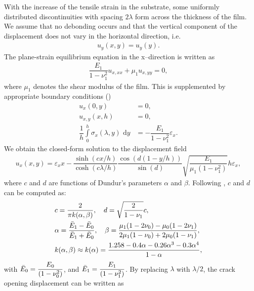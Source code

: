 



With the increase of the tensile strain in the substrate, some uniformly distributed discontinuities with spacing $2\lambda$ form across the thickness of the film. We assume that no debonding occurs and that the vertical component of the displacement does not vary in the horizontal direction, i.e.
\begin{align}
  u_y(x,y) = u_y(y) .
\end{align}
The plane-strain equilibrium equation in the x--direction is written as
\begin{align}
  \dfrac{E_1}{1-\nu_1^2}u_{x,xx} + \mu_1u_{x,yy} = 0 ,
\end{align}
where $\mu_1$ denotes the shear modulus of the film.  This is supplemented by appropriate boundary conditions ()
\begin{align}
  u_x(0,y)                                                    & = 0 ,                                    \\
  u_{x,y}(x,h)                                                & = 0 ,                                    \\
  \dfrac{1}{h}\int\limits_{0}^h \sigma_x(\lambda,y)\text{ d}y & = -\dfrac{E_1}{1-\nu_1^2}\varepsilon_x .
\end{align}
We obtain the closed-form solution to the displacement field
\begin{align}
  u_x(x,y) = \varepsilon_xx-\dfrac{\sinh(cx/h)}{\cosh(c\lambda/h)}\dfrac{\cos(d(1-y/h))}{\sin(d)}\sqrt{\dfrac{E_1}{\mu_1(1-\nu_1^2)}}h\varepsilon_x ,
\end{align}
where $c$ and $d$ are functions of Dundur's parameters $\alpha$ and $\beta$. Following \cite{BEUTH19921657,xia2000crack,yin2008explicit}, $c$ and $d$ can be computed as:
\begin{align}
   & c = \dfrac{2}{\pi k(\alpha,\beta)}, \quad d = \sqrt{\dfrac{2}{1-\nu_1}}c ,                                                                          \\
   & \alpha = \dfrac{\Bar{E}_1-\Bar{E}_0}{\Bar{E}_1+\Bar{E}_0}, \quad \beta = \dfrac{\mu_1(1-2\nu_0)-\mu_0(1-2\nu_1)}{2\mu_1(1-\nu_0)+2\mu_0(1-\nu_1)} , \\
   & k(\alpha,\beta) \approx k(\alpha) = \dfrac{1.258-0.4\alpha-0.26\alpha^3-0.3\alpha^4}{1-\alpha} ,
\end{align}
with $\Bar{E}_0 = \dfrac{E_0}{(1-\nu_0^2)}$, and $\Bar{E}_1 = \dfrac{E_1}{(1-\nu_1^2)}$. By replacing $\lambda$ with $\lambda/2$, the crack opening displacement can be written as
